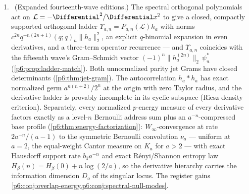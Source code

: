 \documentclass[11pt,oneside]{article}
\numberwithin{equation}{section}
\theoremstyle{definition}
\theoremstyle{remark}
\begin{document}
\begin{enumerate}
\item \newflag\ (Expanded fourteenth-wave editions.)  The spectral
orthogonal polynomials act on $\mathcal L=-\Differential^2/\Differential x^2$ to give a closed,
compactly supported orthogonal ladder
$\Upsilon_{a,n}=P_{a,n}(\mathcal L)h_a$ with norms
$c^{2n}q^{-n(2n+1)}(q;q)_n\|h_a\|_2^2$, an explicit $q$-binomial expansion
in even derivatives, and a three-term operator recurrence --- and
$\Upsilon_{a,n}$ coincides with the fifteenth wave's Gram--Schmidt vector
$(-1)^n\|h_a^{(2n)}\|_2\,\psi_n^{\ast}$ (\cref{p6:prop:ladder-match}).
Both unnormalized parity jet Grams have closed determinants
(\cref{p6:thm:jet-gram}).  The autocorrelation $h_a*h_a$ has exact
normalized germ $a^{n(n+2)}/2^n$ at the origin with zero Taylor radius,
and the derivative ladder is provably incomplete in its cyclic subspace
(Riesz density criterion).  Separately, every normalized $p$-energy
measure of every derivative factors exactly as a level-$n$ Bernoulli
address sum plus an $a^{-n}$-compressed base profile
(\cref{p6:thm:energy-factorization}): $W_\infty$-convergence at rate
$2a^{-n}/(a-1)$ to the symmetric Bernoulli convolution $\nu_a$ ---
uniform at $a=2$, the equal-weight Cantor measure on $K_a$ for $a>2$ ---
with exact Hausdorff support rate $b_1a^{-n}$ and exact R\'enyi/Shannon
entropy law $H_\beta(n)=H_\beta(0)+n\log(2/a)$, so the derivative
hierarchy carries the information dimension $D_a$ of its singular locus.
The register gains
\cref{p6:conj:overlap-energy,p6:conj:spectral-null-modes}.


\end{enumerate}
\end{document}
